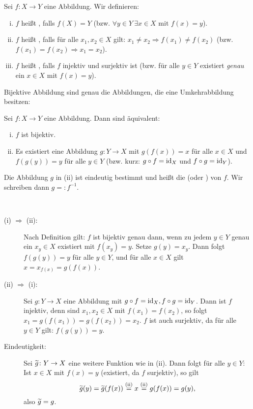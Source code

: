 \begin{definition}
	\label{def:I.2.12}
	Sei $f \colon X \rightarrow Y$ eine Abbildung.
	Wir definieren:
	\begin{enumerate}[(i)]
		\item $f$ heißt , falls $f(X) = Y$ (bzw. $\forall y \in Y \ \exists x \in X \text{ mit } f(x) = y$).
		\item $f$ heißt , falls für alle $x_1,x_2 \in X$ gilt: $x_1 \neq x_2 \Rightarrow f(x_1) \neq f(x_2)$ (bzw. $f(x_1) = f(x_2) \Rightarrow x_1 = x_2$).
		\item $f$ heißt , falls $f$ injektiv und surjektiv ist (bzw. für alle $y \in Y$ existiert \textit{genau} ein $x \in X$ mit $f(x) = y$).
	\end{enumerate}
\end{definition}

Bijektive Abbildung sind genau die Abbildungen, die eine Umkehrabbildung besitzen:

\begin{satz}[Umkehrabbildung]
	\label{satz:I.2.13}
	Sei $f \colon X \rightarrow Y$ eine Abbildung.
	Dann sind äquivalent:
	\begin{enumerate}[(i)]
		\item $f$ ist bijektiv.
		\item Es existiert eine Abbildung $g \colon Y \rightarrow X$ mit $g(f(x))=x$ für alle $x \in X$ und $f(g(y)) = y$ für alle $y \in Y$ (bzw. kurz: $g \circ f = \operatorname{id}_X$ und $f \circ g = \operatorname{id}_Y$).
	\end{enumerate}
	Die Abbildung $g$ in (ii) ist eindeutig bestimmt und heißt die  (oder ) von $f$.
	Wir schreiben dann $g =: f^{-1}$.	
\end{satz}

\begin{beweis}
	\mbox{} \\[-.9cm]
	\begin{description}
		\item[(i) $\Rightarrow$ (ii):] Nach Definition gilt: $f$ ist bijektiv genau dann, wenn zu jedem $y \in Y$ genau ein $x_y \in X$ existiert mit $f(x_y) = y$.
		Setze $g(y) = x_y$.
		Dann folgt $f(g(y)) = y$ für alle $y \in Y$, und für alle $x \in X$ gilt $x = x_{f(x)} = g(f(x))$.
		\item[(ii) $\Rightarrow$ (i):] Sei $g \colon Y \rightarrow X$ eine Abbildung mit $g \circ f = \operatorname{id}_X, f \circ g = \operatorname{id}_Y$.
		Dann ist $f$ injektiv, denn sind $x_1,x_2 \in X$ mit $f(x_1) = f(x_2)$, so folgt $x_1 = g(f(x_1)) = g(f(x_2)) = x_2$.
		$f$ ist auch surjektiv, da für alle $y \in Y$ gilt: $f(g(y))= y$.
		\item[Eindeutigkeit:] Sei $\widetilde{g} \colon Y \rightarrow X$ eine weitere Funktion wie in (ii).
		Dann folgt für alle $y \in Y$:
		Ist $x \in X$ mit $f(x) = y$ (existiert, da $f$ surjektiv), so gilt
		\[
			\widetilde{g}(y) = \widetilde{g}(f(x)) \stackrel{\text{(ii)}}{=} x \stackrel{\text{(ii)}}{=} g(f(x)) = g(y),
		\]
		also $\widetilde{g} = g$. \qedhere
	\end{description}
	\qedhere
\end{beweis}

